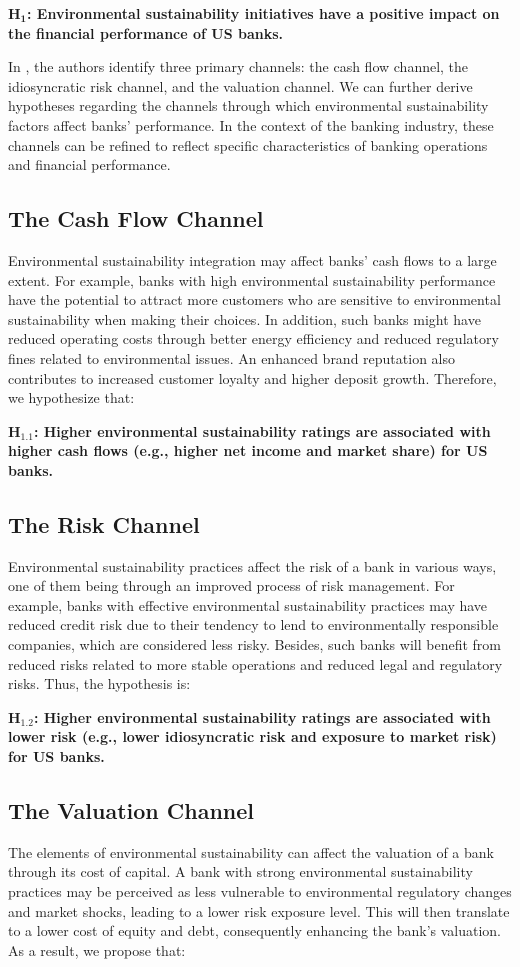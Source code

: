 \documentclass[11pt, a4paper]{article}
\begin{document}
$\mathbf{H_{1}}$\textbf{: Environmental sustainability initiatives have a positive impact on the financial performance of US banks.}

In \cite{Giese2019}, the authors identify three primary channels: the cash flow channel, the idiosyncratic risk channel, and the valuation channel. We can further derive hypotheses regarding the channels through which environmental sustainability factors affect banks' performance. In the context of the banking industry, these channels can be refined to reflect specific characteristics of banking operations and financial performance.

\subsection{The Cash Flow Channel}
Environmental sustainability integration may affect banks' cash flows to a large extent. For example, banks with high environmental sustainability performance have the potential to attract more customers who are sensitive to environmental sustainability when making their choices. In addition, such banks might have reduced operating costs through better energy efficiency and reduced regulatory fines related to environmental issues. An enhanced brand reputation also contributes to increased customer loyalty and higher deposit growth. Therefore, we hypothesize that:

$\mathbf{H_{1.1}}$\textbf{: Higher environmental sustainability ratings are associated with higher cash flows (e.g., higher net income and market share) for US banks.}
\subsection{The Risk Channel}
Environmental sustainability practices affect the risk of a bank in various ways, one of them being through an improved process of risk management. For example, banks with effective environmental sustainability practices may have reduced credit risk due to their tendency to lend to environmentally responsible companies, which are considered less risky. Besides, such banks will benefit from reduced risks related to more stable operations and reduced legal and regulatory risks. Thus, the hypothesis is:

$\mathbf{H_{1.2}}$\textbf{: Higher environmental sustainability ratings are associated with lower risk (e.g., lower idiosyncratic risk and exposure to market risk) for US banks.}
\subsection{The Valuation Channel}
The elements of environmental sustainability can affect the valuation of a bank through its cost of capital. A bank with strong environmental sustainability practices may be perceived as less vulnerable to environmental regulatory changes and market shocks, leading to a lower risk exposure level. This will then translate to a lower cost of equity and debt, consequently enhancing the bank's valuation. As a result, we propose that:
\end{document}
